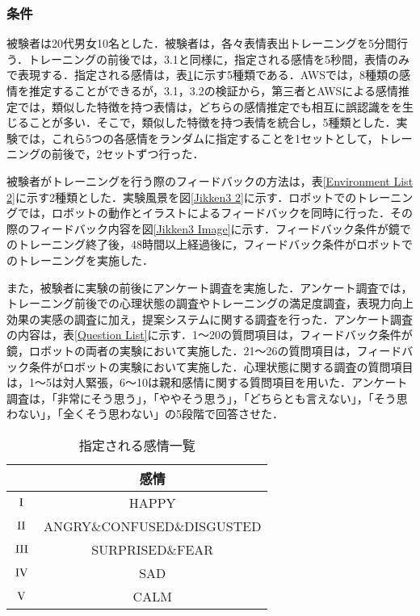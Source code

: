 \documentclass[titlepage]{jarticle}
\begin{document}
\subsubsection{条件}
被験者は20代男女10名とした．被験者は，各々表情表出トレーニングを5分間行う．トレーニングの前後では，3.1と同様に，指定される感情を5秒間，表情のみで表現する．指定される感情は，表\ref{Emotion List 2}に示す5種類である．AWSでは，8種類の感情を推定することができるが，3.1，3.2の検証から，第三者とAWSによる感情推定では，類似した特徴を持つ表情は，どちらの感情推定でも相互に誤認識をを生じることが多い．そこで，類似した特徴を持つ表情を統合し，5種類とした．実験では，これら5つの各感情をランダムに指定することを1セットとして，トレーニングの前後で，2セットずつ行った．

被験者がトレーニングを行う際のフィードバックの方法は，表\ref{Environment List 2}に示す2種類とした．実験風景を図\ref{Jikken3 2}に示す．ロボットでのトレーニングでは，ロボットの動作とイラストによるフィードバックを同時に行った．その際のフィードバック内容を図\ref{Jikken3 Image}に示す．フィードバック条件が鏡でのトレーニング終了後，48時間以上経過後に，フィードバック条件がロボットでのトレーニングを実施した．

また，被験者に実験の前後にアンケート調査を実施した．アンケート調査では，トレーニング前後での心理状態の調査やトレーニングの満足度調査，表現力向上効果の実感の調査に加え，提案システムに関する調査を行った．アンケート調査の内容は，表\ref{Question List}に示す．1〜20の質問項目は，フィードバック条件が鏡，ロボットの両者の実験において実施した．21〜26の質問項目は，フィードバック条件がロボットの実験において実施した．心理状態に関する調査の質問項目は，1〜5は対人緊張，6〜10は親和感情に関する質問項目を用いた\cite{hayashi}．アンケート調査は，「非常にそう思う」，「ややそう思う」，「どちらとも言えない」，「そう思わない」，「全くそう思わない」の5段階で回答させた．

\begin{table}[h]
\centering
\caption{指定される感情一覧}
\begin{tabular}{|c||c|}
    \hline
		 & 感情 \\
	\hline
	\hline
		$\rm\,I\,$ & HAPPY \\
	\hline
		$\rm\,II\,$ & ANGRY\&CONFUSED\&DISGUSTED\\
	\hline
		$\rm\,III\,$ & SURPRISED\&FEAR \\
	\hline
		$\rm\,IV\,$ & SAD \\
	\hline
        $\rm\,V\,$  & CALM \\
	\hline
\end{tabular}
\label{Emotion List 2}
\end{table}
\end{document}
